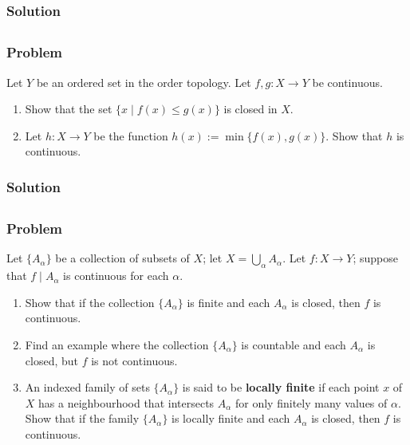\subsubsection{Solution}
\todo


\subsection{}

\subsubsection{Problem}
Let $Y$ be an ordered set in the order topology. Let $f, g : X \to Y$ be continuous.
\begin{enumerate}
    \item Show that the set $\{ x \mid f(x) \leq g(x) \}$ is closed in $X$.
    \item Let $h : X \to Y$ be the function $h(x) := \min\{ f(x), g(x) \}$. Show that $h$ is continuous.
\end{enumerate}

\subsubsection{Solution}
\todo


\subsection{}

\subsubsection{Problem}
Let $\{ A_\alpha \}$ be a collection of subsets of $X$; let $X = \bigcup_\alpha A_\alpha$. Let $f : X \to Y$; suppose that $f \mid A_\alpha$ is continuous for each $\alpha$.
\begin{enumerate}
    \item Show that if the collection $\{A_\alpha\}$ is finite and each $A_\alpha$ is closed, then $f$ is continuous.
    \item Find an example where the collection $\{A_\alpha\}$ is countable and each $A_\alpha$ is closed, but $f$ is not continuous.
    \item An indexed family of sets $\{A_\alpha\}$ is said to be \textbf{locally finite} if each point $x$ of $X$ has a neighbourhood that intersects $A_\alpha$ for only finitely many values of $\alpha$. Show that if the family $\{A_\alpha\}$ is locally finite and each $A_\alpha$ is closed, then $f$ is continuous.
\end{enumerate}

